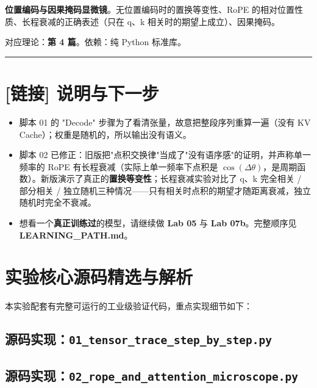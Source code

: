    \textbf{位置编码与因果掩码显微镜}。无位置编码时的置换等变性、RoPE 的相对位置性质、长程衰减的正确表述（只在 q、k 相关时的期望上成立）、因果掩码。

对应理论：\textbf{第 4 篇}。依赖：纯 Python 标准库。

\vspace{0.8em}\hrule\vspace{0.8em}

\section{[链接] 说明与下一步}

\begin{itemize}
  \item 脚本 01 的 "Decode" 步骤为了看清张量，故意把整段序列重算一遍（没有 KV Cache）；权重是随机的，所以输出没有语义。
  \item 脚本 02 已修正：旧版把"点积交换律"当成了"没有语序感"的证明，并声称单一频率的 RoPE 有长程衰减（实际上单一频率下点积是 $\cos(\Delta\theta)$，是周期函数）。新版演示了真正的\textbf{置换等变性}；长程衰减实验对比了 q、k 完全相关 / 部分相关 / 独立随机三种情况——只有相关时点积的期望才随距离衰减，独立随机时完全不衰减。
  \item 想看一个\textbf{真正训练过}的模型，请继续做 \textbf{Lab 05} 与 \textbf{Lab 07b}。完整顺序见 \textbf{LEARNING\_PATH.md}。
\end{itemize}



\section{实验核心源码精选与解析}

本实验配套有完整可运行的工业级验证代码，重点实现细节如下：


\subsection{源码实现：\texttt{01\_tensor\_trace\_step\_by\_step.py}}




\subsection{源码实现：\texttt{02\_rope\_and\_attention\_microscope.py}}



